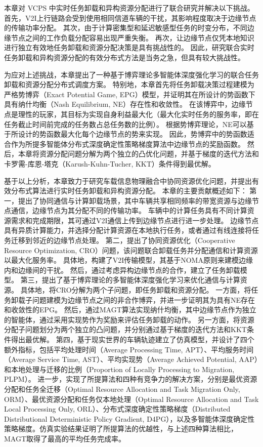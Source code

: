本章对 VCPS 中实时任务卸载和异构资源分配进行了联合研究并解决以下挑战。
首先，V2I上行链路会受到使用相同信道车辆的干扰，其影响程度取决于边缘节点的传输功率分配。
其次，由于计算密集型和延迟敏感型任务的时变分布，不同边缘节点之间的工作负载分配容易出现严重失衡。
再次，让边缘节点仅凭本地知识进行独立有效地任务卸载和资源分配决策是具有挑战性的。
因此，研究联合实时任务卸载和异构资源分配的有效分布式方法是当务之急，但具有较大挑战性。

为应对上述挑战，本章提出了一种基于博弈理论多智能体深度强化学习的联合任务卸载和资源分配分布式调度方案。
特别地，本章首先将任务卸载决策过程建模为严格势博弈（Exact Potential Game, EPG）\cite{chew2016potential}模型，并证明其在所设计的势函数下具有纳什均衡（Nash Equilibrium, NE）存在性和收敛性。
在该博弈中，边缘节点是理性的玩家，其目标为实现自身利益最大化（最大化实时任务的服务率，即在任务截止时间前完成的任务数占总任务数的比例）。
根据势博弈理论，NE可以基于所设计的势函数最大化每个边缘节点的势来实现。
因此，势博弈中的势函数适合作为所提多智能体分布式深度确定性策略梯度算法中边缘节点的奖励函数。
然后，本章将资源分配问题分解为两个独立的凸优化问题，并基于梯度的迭代方法和卡罗需-库恩-塔克（Karush-Kuhn-Tucher, KKT）条件得到最优解。

基于以上分析，本章致力于研究车载信息物理融合中协同资源优化问题，并提出有效分布式算法进行实时任务卸载和异构资源分配。
本章的主要贡献概述如下：
第一，提出了协同通信与计算卸载场景，其中车辆共享相同频率的带宽资源与边缘节点通信，边缘节点为其分配不同的传输功率。
车辆中的计算任务具有不同计算资源需求和完成期限，其可通过V2I通信上传到边缘节点进行进一步处理。
边缘节点具有异质计算能力，并选择分配计算资源在本地执行任务，或者通过有线连接将任务迁移到邻近的边缘节点处理。
第二，提出了协同资源优化（Cooperative Resource Optimization, CRO）问题，该问题联合卸载任务并分配通信和计算资源以最大化服务率。
具体地，构建了V2I传输模型，其基于NOMA原则来建模边缘内和边缘间的干扰。
然后，通过考虑异构边缘节点的合作，建立了任务卸载模型。
第三，提出了基于博弈理论的多智能体深度强化学习来优化通信与计算资源。
具体地，将CRO分解为两个子问题，即任务卸载和资源分配。
一方面，将任务卸载子问题建模为边缘节点之间的非合作博弈，并进一步证明其为具有NE存在和收敛性的EPG。
然后，通过MAGT算法实现纳什均衡，其中边缘节点作为独立的智能体，通过采用实现势作为奖励来评估任务卸载的动作。
另一方面，将资源分配子问题划分为两个独立的凸问题，并分别通过基于梯度的迭代方法和KKT条件得出最优解。
第四，基于现实世界的车辆轨迹建立了仿真模型，并设计了四个额外指标，包括平均处理时间（Average Processing Time, APT）、平均服务时间（Average Service Time, AST）、平均实现势（Average Achieved Potential, AAP）和本地处理与迁移的比例（Proportion of Locally Processing to Migration, PLPM）。
进一步，实现了所提算法和四种有竞争力的解决方案，分别是最优资源分配和任务全迁移（Optimal Resource Allocation and Task Migration Only, ORM）、最优资源分配和任务仅本地处理（Optimal Resource Allocation and Task Local Processing Only, ORL）、分布式深度确定性策略梯度（Distributed Distributional Deterministic Policy Gradient, D4PG）\cite{barth2018distributed}，以及多智能体深度确定性策略梯度\cite{zhang2021adaptive}。仿真实验结果证明了所提算法的优越性，与上述四种算法相比，MAGT取得了最高的平均任务完成率。


